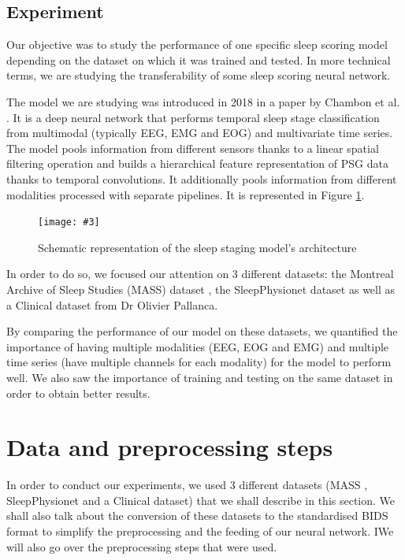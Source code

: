 \documentclass[titlepage, 11pt, a4paper, fancysections]{article}
\newcommand{\fig}[5]{\begin{figure}[#1] \centering \texttt{[image: \#3]} \caption{#4} \label{#5} \end{figure}}
\begin{document}
\subsection{Experiment}
Our objective was to study the performance of one specific sleep scoring model depending on the dataset on which it was trained and tested. In more technical terms, we are studying the transferability of some sleep scoring neural network. 

The model we are studying was introduced in 2018 in a paper by Chambon et al. \autocite{chambon-sleep-scoring}. It is a deep neural network that performs temporal sleep stage classification from multimodal (typically EEG, EMG and EOG) and multivariate time series. The model pools information from different sensors thanks to a linear spatial filtering operation and builds a hierarchical feature representation of PSG data thanks to temporal convolutions. It additionally pools information from different modalities processed with separate pipelines. It is represented in Figure \ref{fig:schema_chambon}.

\fig{ht!}{\linewidth}{model/model-chambon.png}{Schematic representation of the sleep staging model's architecture}{fig:schema_chambon}

In order to do so, we focused our attention on 3 different datasets: the Montreal Archive of Sleep Studies (MASS) dataset \autocite{MASS}, the SleepPhysionet dataset \autocite{SleepPhysionet1, SleepPhysionet2} as well as a Clinical dataset from Dr Olivier Pallanca. 

By comparing the performance of our model on these datasets, we quantified the importance of having multiple modalities (EEG, EOG and EMG) and multiple time series (have multiple channels for each modality) for the model to perform well. We also saw the importance of training and testing on the same dataset in order to obtain better results.

\section{Data and preprocessing steps}
\label{section:data}

In order to conduct our experiments, we used 3 different datasets (MASS \cite{MASS}, SleepPhysionet \cite{SleepPhysionet1,SleepPhysionet2} and a Clinical dataset) that we shall describe in this section. We shall also talk about the conversion of these datasets to the standardised BIDS format to simplify the preprocessing and the feeding of our neural network. IWe will also go over the preprocessing steps that were used.
\end{document}
